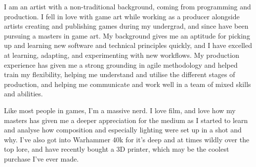 

\begin{cvparagraph}
    I am an artist with a non-traditional background, coming from programming and production. I fell in love with game art while working as a producer alongside artists creating and publishing games during my undergrad, and since have been pursuing a masters in game art. My background gives me an aptitude for picking up and learning new software and technical principles quickly, and I have excelled at learning, adapting, and experimenting with new workflows. My production experience has given me a strong grounding in agile methodology and helped train my flexibility, helping me understand and utilise the different stages of production, and helping me communicate and work well in a team of mixed skills and abilities.

    Like most people in games, I'm a massive nerd. I love film, and love how my masters has given me a deeper appreciation for the medium as I started to learn and analyse how composition and especially lighting were set up in a shot and why. I've also got into Warhammer 40k for it's deep and at times wildly over the top lore, and have recently bought a 3D printer, which may be the coolest purchase I've ever made.
\end{cvparagraph}